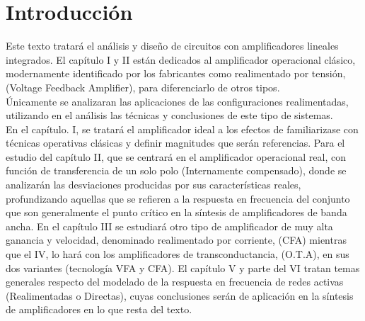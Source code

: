 \section*{Introducción}
Este texto tratará el análisis y diseño de circuitos con amplificadores lineales integrados. El capítulo I y II están dedicados al amplificador operacional 
clásico, modernamente identificado por los fabricantes como realimentado por 
tensión, (Voltage Feedback Amplifier), para diferenciarlo de otros tipos. \\
Únicamente se analizaran las aplicaciones de las configuraciones realimentadas, 
utilizando  en el análisis las técnicas y conclusiones de este tipo de sistemas. \\
En el  capítulo. 
I, se tratará el amplificador ideal a los efectos de familiarizase  
con técnicas operativas clásicas y definir magnitudes que serán referencias. 
Para el  estudio del capítulo II, que se centrará en el amplificador operacional 
real, con función de transferencia de un solo polo (Internamente compensado), 
donde se analizarán las desviaciones producidas por sus características reales, 
profundizando aquellas que se refieren a la respuesta en frecuencia del conjunto que son generalmente el punto crítico en la síntesis de amplificadores de 
banda ancha. En el capítulo III se estudiará otro tipo de amplificador de muy 
alta ganancia y velocidad, denominado  realimentado por corriente, (CFA) 
mientras que el IV, lo hará con los amplificadores de transconductancia, 
(O.T.A), en sus dos variantes (tecnología VFA y CFA). El capítulo V y parte del 
VI tratan temas generales respecto del modelado de la respuesta en frecuencia 
de redes activas  (Realimentadas o Directas), cuyas conclusiones serán de 
aplicación en la síntesis de amplificadores en lo que resta del texto.
\newpage